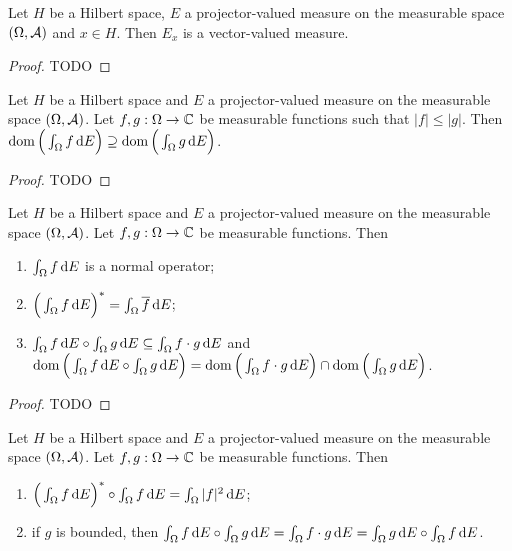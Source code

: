 \begin{lemma}
Let $H$ be a Hilbert space, $E$ a projector-valued measure on the measurable space $\sSet{\Omega,\mathcal{A}}$ and $x\in H$. Then $E_x$ is a vector-valued measure.
\end{lemma}
\begin{proof}
TODO
\end{proof}

\begin{lemma} \label{projectorIntegrableSolid}
Let $H$ be a Hilbert space and $E$ a projector-valued measure on the measurable space $\sSet{\Omega,\mathcal{A}}$. Let $f,g: \Omega\to \mathbb{C}$ be measurable functions such that $|f|\leq |g|$. Then $\operatorname{dom}\Big(\int_\Omega f \operatorname{d \!}{E}\Big) \supseteq \operatorname{dom}\Big(\int_\Omega g \operatorname{d \!}{E}\Big)$.
\end{lemma}
\begin{proof}
TODO
\end{proof}

\begin{proposition} \label{integralProjectorValuedMeasure}
Let $H$ be a Hilbert space and $E$ a projector-valued measure on the measurable space $\sSet{\Omega,\mathcal{A}}$. Let $f,g: \Omega\to \mathbb{C}$ be measurable functions. Then
\begin{enumerate}
\item $\int_\Omega f\operatorname{d \!}{E}$ is a normal operator;
\item $\Big(\int_\Omega f\operatorname{d \!}{E}\Big)^* = \int_\Omega \overline{f}\operatorname{d \!}{E}$;
\item $\int_\Omega f\operatorname{d \!}{E}\circ \int_\Omega g\operatorname{d \!}{E} \subseteq \int_\Omega f\cdot g\operatorname{d \!}{E}$ and $\operatorname{dom}\Big(\int_\Omega f\operatorname{d \!}{E}\circ\int_\Omega g\operatorname{d \!}{E}\Big) = \operatorname{dom}\Big(\int_\Omega f\cdot g\operatorname{d \!}{E}\Big)\cap \operatorname{dom}\Big(\int_\Omega g\operatorname{d \!}{E}\Big)$.
\end{enumerate}
\end{proposition}
\begin{proof}
TODO
\end{proof}
\begin{corollary}
Let $H$ be a Hilbert space and $E$ a projector-valued measure on the measurable space $\sSet{\Omega,\mathcal{A}}$. Let $f,g: \Omega\to \mathbb{C}$ be measurable functions. Then
\begin{enumerate}
\item $\Big(\int_\Omega f\operatorname{d \!}{E}\Big)^*\circ \int_\Omega f\operatorname{d \!}{E} = \int_\Omega |f|^2\operatorname{d \!}{E}$;
\item if $g$ is bounded, then $\int_\Omega f\operatorname{d \!}{E}\circ \int_\Omega g\operatorname{d \!}{E} = \int_\Omega f\cdot g\operatorname{d \!}{E} = \int_\Omega g\operatorname{d \!}{E}\circ \int_\Omega f\operatorname{d \!}{E}$.
\end{enumerate}
\end{corollary}

